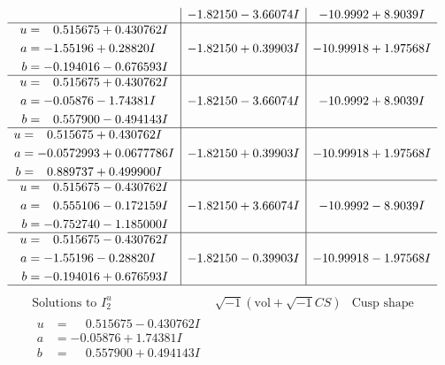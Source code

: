 \documentclass[1p]{elsarticle_modified}
\theoremstyle{definition}
\newcommand{\I}{\sqrt{-1}}
\begin{document}
$$\begin{array}{c|c|c}
 & -1.82150 - 3.66074 I & -10.9992 + 8.9039 I \\ \hline\begin{aligned}
u &= \phantom{-}0.515675 + 0.430762 I \\
a &= -1.55196 + 0.28820 I \\
b &= -0.194016 - 0.676593 I\end{aligned}
 & -1.82150 + 0.39903 I & -10.99918 + 1.97568 I \\ \hline\begin{aligned}
u &= \phantom{-}0.515675 + 0.430762 I \\
a &= -0.05876 - 1.74381 I \\
b &= \phantom{-}0.557900 - 0.494143 I\end{aligned}
 & -1.82150 - 3.66074 I & -10.9992 + 8.9039 I \\ \hline\begin{aligned}
u &= \phantom{-}0.515675 + 0.430762 I \\
a &= -0.0572993 + 0.0677786 I \\
b &= \phantom{-}0.889737 + 0.499900 I\end{aligned}
 & -1.82150 + 0.39903 I & -10.99918 + 1.97568 I \\ \hline\begin{aligned}
u &= \phantom{-}0.515675 - 0.430762 I \\
a &= \phantom{-}0.555106 - 0.172159 I \\
b &= -0.752740 - 1.185000 I\end{aligned}
 & -1.82150 + 3.66074 I & -10.9992 - 8.9039 I \\ \hline\begin{aligned}
u &= \phantom{-}0.515675 - 0.430762 I \\
a &= -1.55196 - 0.28820 I \\
b &= -0.194016 + 0.676593 I\end{aligned}
 & -1.82150 - 0.39903 I & -10.99918 - 1.97568 I\\
 \hline 
 \end{array}$$\newpage$$\begin{array}{c|c|c}  
\text{Solutions to }I^u_{2}& \I (\text{vol} + \sqrt{-1}CS) & \text{Cusp shape}\\
 \hline 
\begin{aligned}
u &= \phantom{-}0.515675 - 0.430762 I \\
a &= -0.05876 + 1.74381 I \\
b &= \phantom{-}0.557900 + 0.494143 I\end{aligned}

\end{array}$$
\end{document}
